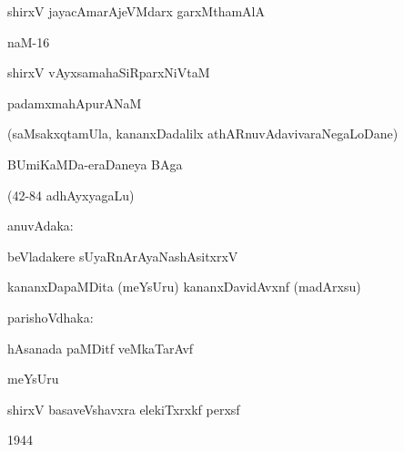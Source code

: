 \documentclass{article}
\begin{document}
\begin{center}
 shirxV jayacAmarAjeVMdarx garxMthamAlA
\end{center}

\begin{center}
naM-16
\end{center}

\begin{center}
shirxV vAyxsamahaSiRparxNiVtaM
\end{center}

\begin{center}
padamxmahApurANaM
\end{center}

\begin{center}
(saMsakxqtamUla, kananxDadalilx athARnuvAdavivaraNegaLoDane)
\end{center}

\begin{center}
BUmiKaMDa-eraDaneya BAga
\end{center}

\begin{center}
(42-84 adhAyxyagaLu)
\end{center}

\begin{center}
anuvAdaka:
\end{center}

\begin{center}
beVladakere sUyaRnArAyaNashAsitxrxV
\end{center}

\begin{center}
kananxDapaMDita (meYsUru) kananxDavidAvxnf (madArxsu)
\end{center}

\begin{center}
parishoVdhaka:
\end{center}

\begin{center}
hAsanada paMDitf veMkaTarAvf
\end{center}

\begin{center}
meYsUru
\end{center}

\begin{center}
shirxV basaveVshavxra elekiTxrxkf perxsf
\end{center}

\begin{center}
1944
\end{center}
\end{document}
